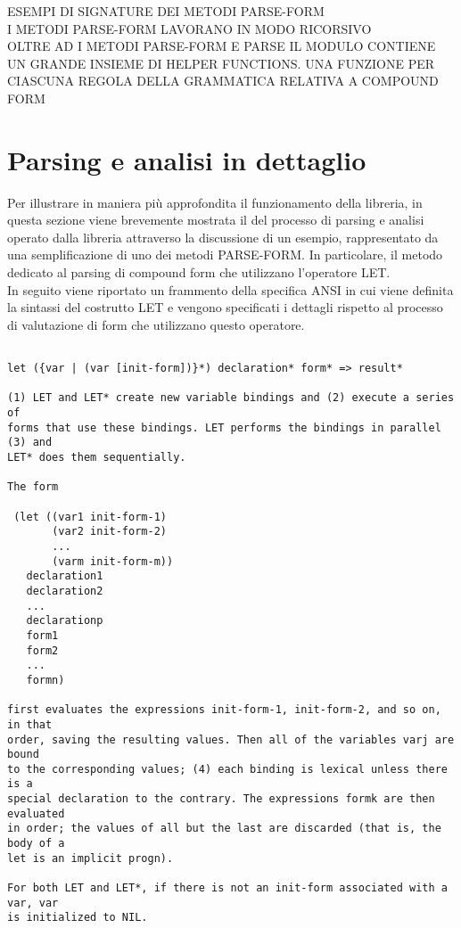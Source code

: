 ESEMPI DI SIGNATURE DEI METODI PARSE-FORM\\

I METODI PARSE-FORM LAVORANO IN MODO RICORSIVO\\

OLTRE AD I METODI PARSE-FORM E PARSE IL MODULO CONTIENE UN GRANDE INSIEME DI
HELPER FUNCTIONS. UNA FUNZIONE PER CIASCUNA REGOLA DELLA GRAMMATICA RELATIVA A
COMPOUND FORM

\section{Parsing e analisi in dettaglio}

Per illustrare in maniera più approfondita il funzionamento della libreria, in
questa sezione viene brevemente mostrata il del processo di parsing e analisi
operato dalla libreria attraverso la discussione di un esempio, rappresentato
da una semplificazione di uno dei metodi PARSE-FORM. In particolare, il metodo
dedicato al parsing di compound form che utilizzano l’operatore LET.\\

In seguito viene riportato un frammento della specifica ANSI in cui viene
definita la sintassi del costrutto LET e vengono specificati i dettagli
rispetto al processo di valutazione di form che utilizzano questo operatore.\\

\begin{lstlisting}

let ({var | (var [init-form])}*) declaration* form* => result*

(1) LET and LET* create new variable bindings and (2) execute a series of
forms that use these bindings. LET performs the bindings in parallel (3) and
LET* does them sequentially.

The form

 (let ((var1 init-form-1)
       (var2 init-form-2)
       ...
       (varm init-form-m))
   declaration1
   declaration2
   ...
   declarationp
   form1
   form2
   ...
   formn)

first evaluates the expressions init-form-1, init-form-2, and so on, in that
order, saving the resulting values. Then all of the variables varj are bound
to the corresponding values; (4) each binding is lexical unless there is a
special declaration to the contrary. The expressions formk are then evaluated
in order; the values of all but the last are discarded (that is, the body of a
let is an implicit progn).

For both LET and LET*, if there is not an init-form associated with a var, var
is initialized to NIL.

\end{lstlisting}

